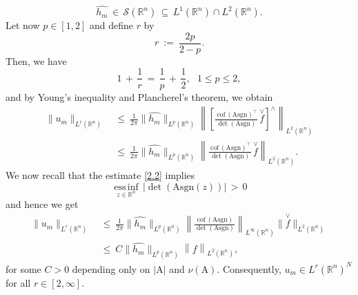 \documentclass{amsart}
\theoremstyle{definition}
\numberwithin{equation}{section}
\begin{document}
\[
\widehat{h_m}\, \in \,{\mathcal{S}}({\mathbb{R}}^n) \, {\subseteq} \, L^1({\mathbb{R}}^n)\cap L^2({\mathbb{R}}^n).
\]
Let now $p\in [1,2]$ and define $r$ by
\[
r\ :=\ \frac{2p}{2-p}.
\]
Then, we have
\[
1\, +\, \frac{1}{r}\, =\, \frac{1}{p}\, +\, \frac{1}{2}, \ \ \ 1\leq p\leq2,
\]
and by Young's inequality and Plancherel's theorem, we obtain
\begin{align}
\|u_m\|_{L^r({\mathbb{R}}^n)}\ &\leq \  \frac{1}{2\pi} \big\| \widehat{h_m} \big\|_{L^p({\mathbb{R}}^n)} 
\left\| \left[ 
\frac{ \ {\textrm{cof}} \,({\textrm{A}} {\textrm{sgn}} )^\top }{ \det ({\textrm{A}} {\textrm{sgn}}) }\, \overset{\vee}{f}
\right]^{\wedge}   
\right\|_{L^2({\mathbb{R}}^n)}   \nonumber\\
 &\leq \  \frac{1}{2\pi} \big\| \widehat{h_m} \big\|_{L^p({\mathbb{R}}^n)} 
\left\|
\frac{ \ {\textrm{cof}} \,({\textrm{A}} {\textrm{sgn}} )^\top }{ \det ({\textrm{A}} {\textrm{sgn}}) }\, \overset{\vee}{f}
\right\|_{L^2({\mathbb{R}}^n)} \nonumber .
\end{align}
We now recall that the estimate \eqref{2.2}  implies 
\[
\underset{z\in {\mathbb{R}}^n}{{\textrm{ess}}\,\inf}\, \big|\det ({\textrm{A}} {\textrm{sgn}}(z))\big|\, >\, 0 
\]
and hence we get
\begin{align}
\|u_m\|_{L^r({\mathbb{R}}^n)}\ 
&\leq \ \frac{1}{2\pi} \big\| \widehat{h_m} \big\|_{L^p({\mathbb{R}}^n)} 
\left\|
\frac{ \, {\textrm{cof}} \,({\textrm{A}} {\textrm{sgn}} ) }{ \det ({\textrm{A}} {\textrm{sgn}}) }\right\|_{L^\infty({\mathbb{R}}^n)}  
\big\|\overset{\vee}{f}
\big\|_{L^2({\mathbb{R}}^n)}   \nonumber\\
&\leq \  C \big\| \widehat{h_m} \big\|_{L^p({\mathbb{R}}^n)} 
\left\|f
\right\|_{L^2({\mathbb{R}}^n)}, \nonumber
\end{align}
for some $C>0$ depending only on $|{\textrm{A}}|$ and $\nu({\textrm{A}})$. Consequently, $u_m  \in L^r({\mathbb{R}}^n)^N$ for all $r \in [2, \infty]$.  
\end{document}
